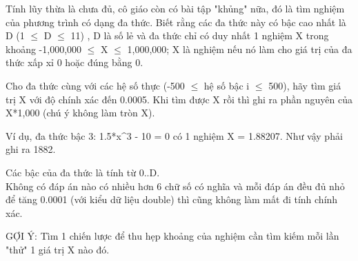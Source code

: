 Tính lũy thừa là chưa đủ, cô giáo còn có bài tập "khủng" nữa, đó là tìm nghiệm của phương trình có dạng đa thức. Biết rằng các đa thức này có bậc cao nhất là D (1  $\le$  D  $\le$  11) , D là số lẻ và đa thức chỉ có duy nhất 1 nghiệm X trong khoảng -1,000,000  $\le$  X  $\le$  1,000,000; X là nghiệm nếu nó làm cho giá trị của đa thức xấp xỉ 0 hoặc đúng bằng 0.  

   Cho đa thức cùng với các hệ số thực (-500  $\le$  hệ số bậc i  $\le$  500), hãy tìm giá trị X với độ chính xác đến 0.0005. Khi tìm được X rồi thì ghi ra phần nguyên của X*1,000 (chú ý không làm tròn X).  

   Ví dụ, đa thức bậc 3: 1.5*x^3 - 10 = 0 có 1 nghiệm X = 1.88207. Như vậy phải ghi ra 1882.  

   Các bậc của đa thức là tính từ 0..D.   
\\

   Không có đáp án nào có nhiều hơn 6 chữ số có nghĩa và mỗi đáp án đều đủ nhỏ  để tăng 0.0001 (với kiểu dữ liệu double) thì cũng không làm mất đi tính chính xác.  

   GỢI Ý: Tìm 1 chiến lược để thu hẹp khoảng của nghiệm cần tìm kiếm mỗi lần "thử" 1 giá trị X nào đó.  

\